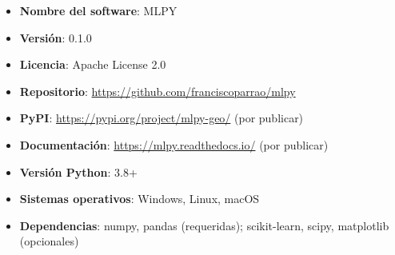 \documentclass[twoside,11pt]{article}
\begin{document}
\begin{itemize}
\item \textbf{Nombre del software}: MLPY
\item \textbf{Versión}: 0.1.0
\item \textbf{Licencia}: Apache License 2.0
\item \textbf{Repositorio}: \url{https://github.com/franciscoparrao/mlpy}
\item \textbf{PyPI}: \url{https://pypi.org/project/mlpy-geo/} (por publicar)
\item \textbf{Documentación}: \url{https://mlpy.readthedocs.io/} (por publicar)
\item \textbf{Versión Python}: 3.8+
\item \textbf{Sistemas operativos}: Windows, Linux, macOS
\item \textbf{Dependencias}: numpy, pandas (requeridas); scikit-learn, scipy, matplotlib (opcionales)
\end{itemize}



\end{document}
